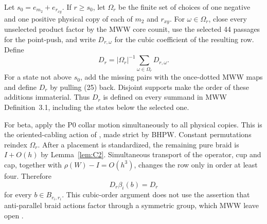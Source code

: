 \documentclass[11pt]{amsart}
\theoremstyle{definition}
\theoremstyle{remark}
\begin{document}
Let $s_0=e_{m_2}+e_{r_{xy}}$.  If $r\ge s_0$, let $\Omega_r$ be the finite set
of choices of one negative and one positive physical copy of each of $m_2$
and $r_{xy}$.  For $\omega\in\Omega_r$, close every unselected product factor
by the MWW core counit, use the selected 44 passages for the point-push, and
write $D_{r,\omega}$ for the cubic coefficient of the resulting row.  Define
\[
D_r=|\Omega_r|^{-1}\sum_{\omega\in\Omega_r}D_{r,\omega}.
\tag{25}
\]
For a state not above $s_0$, add the missing pairs with the once-dotted MWW
maps and define $D_r$ by pulling (25) back.  Disjoint supports make the order
of these additions immaterial.  Thus $D_r$ is defined on
every summand in
MWW Definition~3.1, including the states below the selected one.

For beta, apply the P0 collar motion simultaneously to all physical copies.
This is the oriented-cabling action of
\cite[Theorem~E]{BeliakovaPutyraWehrli2019}, made strict by BHPW.  Constant
permutations reindex $\Omega_r$.  After a placement is standardized, the
remaining pure braid is \(I+O(h)\) by Lemma~\ref{lem:C2}.  Simultaneous transport of the
operator, cup and cap, together with $\rho(W)-I=O(h^3)$, changes the row only
in order at least four.  Therefore
\[
D_r\beta_i(b)=D_r
\tag{26}
\]
for every $b\in B_{r_i,r_i}$.  This cubic-order argument does not use the
assertion that anti-parallel braid actions factor through a symmetric group,
which MWW leave open
\cite[Remark~3.3]{ManolescuWalkerWedrich2023}.
\end{document}
